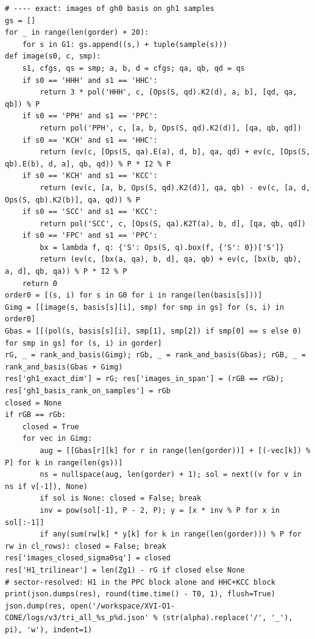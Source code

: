 \documentclass[10pt]{article}
\begin{document}
\begin{lstlisting}
# ---- exact: images of gh0 basis on gh1 samples
gs = []
for _ in range(len(gorder) + 20):
    for s in G1: gs.append((s,) + tuple(sample(s)))
def image(s0, c, smp):
    s1, cfgs, qs = smp; a, b, d = cfgs; qa, qb, qd = qs
    if s0 == 'HHH' and s1 == 'HHC':
        return 3 * pol('HHH', c, [Ops(S, qd).K2(d), a, b], [qd, qa, qb]) % P
    if s0 == 'PPH' and s1 == 'PPC':
        return pol('PPH', c, [a, b, Ops(S, qd).K2(d)], [qa, qb, qd])
    if s0 == 'KCH' and s1 == 'HHC':
        return (ev(c, [Ops(S, qa).E(a), d, b], qa, qd) + ev(c, [Ops(S, qb).E(b), d, a], qb, qd)) % P * I2 % P
    if s0 == 'KCH' and s1 == 'KCC':
        return (ev(c, [a, b, Ops(S, qd).K2(d)], qa, qb) - ev(c, [a, d, Ops(S, qb).K2(b)], qa, qd)) % P
    if s0 == 'SCC' and s1 == 'KCC':
        return pol('SCC', c, [Ops(S, qa).K2T(a), b, d], [qa, qb, qd])
    if s0 == 'FPC' and s1 == 'PPC':
        bx = lambda f, q: {'S': Ops(S, q).box(f, {'S': 0})['S']}
        return (ev(c, [bx(a, qa), b, d], qa, qb) + ev(c, [bx(b, qb), a, d], qb, qa)) % P * I2 % P
    return 0
order0 = [(s, i) for s in G0 for i in range(len(basis[s]))]
Gimg = [[image(s, basis[s][i], smp) for smp in gs] for (s, i) in order0]
Gbas = [[(pol(s, basis[s][i], smp[1], smp[2]) if smp[0] == s else 0) for smp in gs] for (s, i) in gorder]
rG, _ = rank_and_basis(Gimg); rGb, _ = rank_and_basis(Gbas); rGB, _ = rank_and_basis(Gbas + Gimg)
res['gh1_exact_dim'] = rG; res['images_in_span'] = (rGB == rGb); res['gh1_basis_rank_on_samples'] = rGb
closed = None
if rGB == rGb:
    closed = True
    for vec in Gimg:
        aug = [[Gbas[r][k] for r in range(len(gorder))] + [(-vec[k]) % P] for k in range(len(gs))]
        ns = nullspace(aug, len(gorder) + 1); sol = next((v for v in ns if v[-1]), None)
        if sol is None: closed = False; break
        inv = pow(sol[-1], P - 2, P); y = [x * inv % P for x in sol[:-1]]
        if any(sum(rw[k] * y[k] for k in range(len(gorder))) % P for rw in cl_rows): closed = False; break
res['images_closed_sigma0sq'] = closed
res['H1_trilinear'] = len(Zg1) - rG if closed else None
# sector-resolved: H1 in the PPC block alone and HHC+KCC block
print(json.dumps(res), round(time.time() - T0, 1), flush=True)
json.dump(res, open('/workspace/XVI-O1-CONE/logs/v3/tri_all_%s_p%d.json' % (str(alpha).replace('/', '_'), pi), 'w'), indent=1)
\end{lstlisting}
\end{document}
